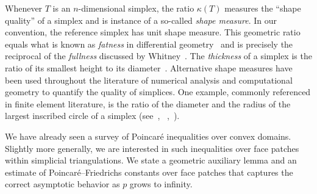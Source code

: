 \documentclass[a4paper]{article}
\begin{document}
\begin{remark}
    Whenever $T$ is an $n$-dimensional simplex, the ratio $\kappa(T)$ measures the ``shape quality'' of a simplex and is instance of a so-called \emph{shape measure}.
    In our convention, the reference simplex has unit shape measure.
    This geometric ratio equals what is known as \emph{fatness} in differential geometry~\cite{cheeger1984curvature} and is precisely the reciprocal of the \emph{fullness} discussed by Whitney~\cite{whitney2012geometric}. 
    The \emph{thickness} of a simplex is the ratio of its smallest height to its diameter~\cite{munkres2016elementary}.
    Alternative shape measures have been used throughout the literature of numerical analysis and computational geometry to quantify the quality of simplices.
    One example, commonly referenced in finite element literature, is the ratio of the diameter and the radius of the largest inscribed circle of a simplex 
    (see~\cite[p.61, Definition 5.1]{braess2001finite}, ~\cite[p.97, Definition (4.2.16)]{brenner2008mathematical},~\cite[Definition~11.2]{ern2021finite}). 
\end{remark}



We have already seen a survey of Poincar\'e inequalities over convex domains. 
Slightly more generally, we are interested in such inequalities over face patches within simplicial triangulations. 
We state a geometric auxiliary lemma and an estimate of Poincar\'e--Friedrichs constants over face patches 
that captures the correct asymptotic behavior as $p$ grows to infinity.
\end{document}
